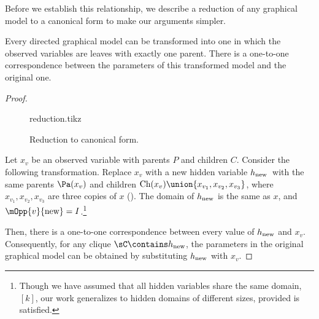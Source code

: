 
Before we establish this relationship,
we describe a reduction of any graphical model to
  a canonical form to make our arguments simpler.

\begin{lemma}
  \label{lem:reduction}
Every directed graphical model can be transformed into one in which
  the observed variables are leaves with exactly one parent. 
There is a one-to-one correspondence between the parameters of this
  transformed model and the original one.
\end{lemma}
\begin{proof}
  \begin{figure}
    \centering
    {reduction.tikz}
    \caption{Reduction to canonical form.}
    \label{fig:reduction}
  \end{figure}

  \providecommand{\hp}{\ensuremath{h_\text{\rm new}}}

  Let $x_v$ be an observed variable with parents $P$ and children $C$.
  Consider the following transformation.
  Replace $x_v$ with a new hidden variable \hp\ with the same
  parents $\Pa(x_v)$ and children $\text{Ch}(x_v) \union \{x_{v_1}, x_{v_2}, x_{v_3}\}$,
  where $x_{v_1},x_{v_2},x_{v_3}$ are three copies of $x$
  (). 
  The domain of $\hp$ is the same as $x$,
    and $\mOpp{v}{\textrm{new}} = I$.\footnote{Though we have assumed that all hidden variables share the
      same domain, $[k]$, our work generalizes to hidden domains of
      different sizes, provided  is satisfied.
      }

  Then, there is a one-to-one correspondence between every value of
  $\hp$ and $x_v$. Consequently, for any clique $\sC \contains \hp$, the
  parameters in the original graphical model can be obtained by
  substituting $\hp$ with $x_v$.
\end{proof}

